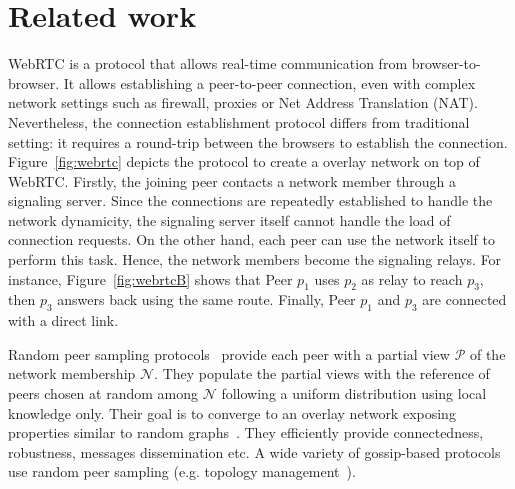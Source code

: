 
\section{Related work}
\label{sec:relatedwork}

\begin{figure*}
\centering
{}
\hspace{20pt}
\hspace{20pt}
\caption{\label{fig:webrtc}Creating an overlay network on top of WebRTC.}
\end{figure*}

WebRTC is a protocol that allows real-time communication from
browser-to-browser. It allows establishing a peer-to-peer connection, even with
complex network settings such as firewall, proxies or Net Address Translation
(NAT). Nevertheless, the connection establishment protocol differs from
traditional setting: it requires a round-trip between the browsers to establish
the connection. Figure~\ref{fig:webrtc} depicts the protocol to create a
overlay network on top of WebRTC. Firstly, the joining peer contacts a network
member through a signaling server. Since the connections are repeatedly
established to handle the network dynamicity, the signaling server itself
cannot handle the load of connection requests. On the other hand, each peer can
use the network itself to perform this task. Hence, the network members become
the signaling relays. For instance, Figure~\ref{fig:webrtcB} shows that Peer
$p_1$ uses $p_2$ as relay to reach $p_3$, then $p_3$ answers back using the
same route. Finally, Peer $p_1$ and $p_3$ are connected with a direct
link. 

Random peer sampling protocols~\cite{jelasity2004peer} provide each peer with a
partial view $\mathcal{P}$ of the network membership $\mathcal{N}$. They
populate the partial views with the reference of peers chosen at random among
$\mathcal{N}$ following a uniform distribution using local knowledge
only. Their goal is to converge to an overlay network exposing properties
similar to random graphs~\cite{erdos1959random}. They efficiently provide
connectedness, robustness, messages dissemination etc. A wide variety of
gossip-based protocols use random peer sampling (e.g. topology
management~\cite{voulgaris2005epidemic, jelasity2009tman, dabek2004vivaldi}).

